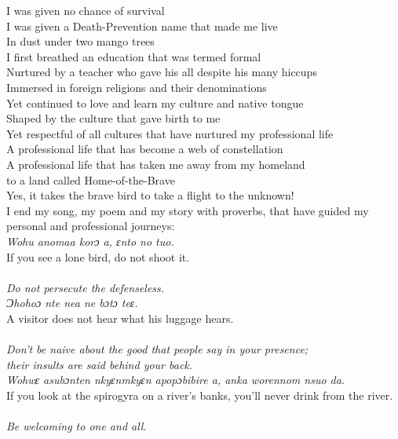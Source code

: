 \begin{refsection}
\noindent I was given no chance of survival\\
I was given a Death-Prevention name that made me live\\
In dust under two mango trees \\
\hspace*{10mm}I first breathed an education that was termed formal\\
Nurtured by a teacher who gave his all despite his many hiccups\\
Immersed in foreign religions and their denominations \\
Yet continued to love and learn my culture and native tongue\\
Shaped by the culture that gave birth to me\\
Yet respectful of all cultures that have nurtured my professional life\\
A professional life that has become a web of constellation\\
A professional life that has taken me away from my homeland\\
\hspace*{10mm}to a land called Home-of-the-Brave\\
Yes, it takes the brave bird to take a flight to the unknown!\\

\noindent I end my song, my poem and my story with proverbs, that have guided my personal and professional journeys:\\

\noindent\textit{Wohu anomaa korɔ a, ɛnto no tuo.}\\
If you see a lone bird, do not shoot it.\\ \\
\hspace*{10mm}\textit{Do not persecute the defenseless.}\\

\noindent\textit{Ɔhohoɔ nte nea ne bɔtɔ teɛ.}\\ 
A visitor does not hear what his luggage hears.\\ \\
\hspace*{10mm}\textit{Don’t be naive about the good that people say in your presence;}\\
\hspace*{10mm}\textit{their insults are said behind your back.}\\

\newpage
\noindent\textit{Wohwɛ asubɔnten nkyɛnmkyɛn apopɔbibire a, anka worennom nsuo da.}\\
If you look at the spirogyra on a river’s banks, you’ll never drink from the river.\\ \\
\hspace*{10mm}\textit{Be welcoming to one and all}.\\


\end{refsection}
